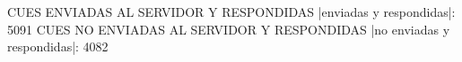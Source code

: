 CUES ENVIADAS AL SERVIDOR Y RESPONDIDAS
|enviadas y respondidas|: 5091
CUES NO ENVIADAS AL SERVIDOR Y RESPONDIDAS
|no enviadas y respondidas|: 4082